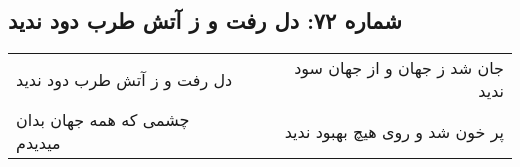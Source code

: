 \begin{center}
\section*{شماره ۷۲: دل رفت و ز آتش طرب دود ندید}
\label{sec:072}
\begin{longtable}{l p{0.5cm} r}
دل رفت و ز آتش طرب دود ندید
&&
جان شد ز جهان و از جهان سود ندید
\\
چشمی که همه جهان بدان میدیدم
&&
پر خون شد و روی هیچ بهبود ندید
\\
\end{longtable}
\end{center}
